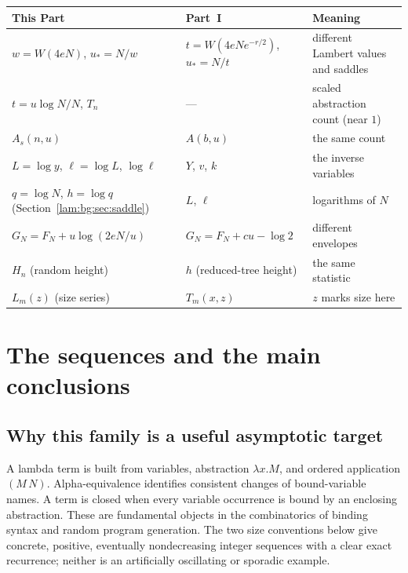 \documentclass[11pt,a4paper]{article}
\numberwithin{equation}{section}
\theoremstyle{remark}
\begin{document}
\begin{center}
\small
\begin{tabular}{@{}>{\raggedright\arraybackslash}p{} >{\raggedright\arraybackslash}p{} >{\raggedright\arraybackslash}p{}@{}}
\toprule
This Part & Part~I & Meaning\\
\midrule
$w=W(4eN)$, $u_*=N/w$ & $t=W(4eNe^{-r/2})$, $u_*=N/t$ & different Lambert values and saddles\\
$t=u\log N/N$, $T_n$ & --- & scaled abstraction count (near $1$)\\
$A_s(n,u)$ & $A(b,u)$ & the same count\\
$L=\log y$, $\ell=\log L$, $\log\ell$ & $Y$, $v$, $k$ & the inverse variables\\
$q=\log N$, $h=\log q$ (Section~\ref{lam:bg:sec:saddle}) & $L$, $\ell$ & logarithms of $N$\\
$G_N=F_N+u\log(2eN/u)$ & $G_N=F_N+cu-\log2$ & different envelopes\\
$H_n$ (random height) & $h$ (reduced-tree height) & the same statistic\\
$L_m(z)$ (size series) & $T_m(x,z)$ & $z$ marks size here\\
\bottomrule
\end{tabular}
\end{center}

\section{The sequences and the main conclusions}

\subsection{Why this family is a useful asymptotic target}
A lambda term is built from variables, abstraction $\lambda x.M$, and ordered application $(M\,N)$. Alpha-equivalence identifies consistent changes of bound-variable names. A term is closed when every variable occurrence is bound by an enclosing abstraction. These are fundamental objects in the combinatorics of binding syntax and random program generation. The two size conventions below give concrete, positive, eventually nondecreasing integer sequences with a clear exact recurrence; neither is an artificially oscillating or sporadic example.
\end{document}

